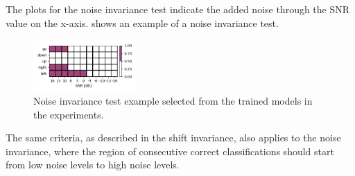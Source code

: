 \FloatBarrier
\noindent
The plots for the noise invariance test indicate the added noise through the SNR value on the x-axis.
 shows an example of a noise invariance test.
\begin{figure}[!ht]
  \centering
    \includegraphics[width=0.35\textwidth]{./5_exp/figs/exp_fs_cepstral_tb_noise_conv-jim_mfcc12_norm0.png}
  \caption{Noise invariance test example selected from the trained models in the experiments.}
  \label{fig:exp_details_tb_noise}
\end{figure}
\FloatBarrier
\noindent
The same criteria, as described in the shift invariance, also applies to the noise invariance, where the region of consecutive correct classifications should start from low noise levels to high noise levels.